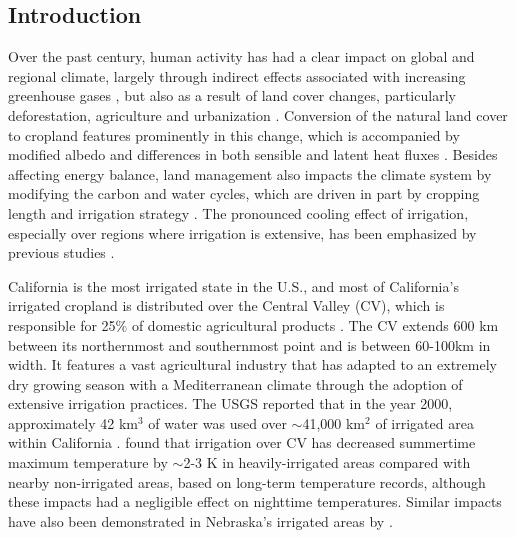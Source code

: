 \documentclass[draft,ms]{agutex}   %
\begin{document}
\begin{article}


%
\section{Introduction}

Over the past century, human activity has had a clear impact on global and regional climate, largely through indirect effects associated with increasing greenhouse gases \citep{solomon2007ipcc}, but also as a result of land cover changes, particularly deforestation, agriculture and urbanization \citep{bonan1997effects, pielke2002influence, kueppers2008seasonal}. Conversion of the natural land cover to cropland features prominently in this change, which is accompanied by modified albedo and differences in both sensible and latent heat fluxes \citep{foley2003green}. Besides affecting energy balance, land management also impacts the climate system by modifying the carbon and water cycles, which are driven in part by cropping length and irrigation strategy \citep{lobell2006biogeophysical}. The pronounced cooling effect of irrigation, especially over regions where irrigation is extensive, has been emphasized by previous studies \citep{kueppers2007irrigation, lobell2008effect}.

California is the most irrigated state in the U.S., and most of California's irrigated cropland is distributed over the Central Valley (CV), which is responsible for 25$\%$ of domestic agricultural products \citep{wilkinson2002preparing}. The CV extends 600 km between its northernmost and southernmost point and is between 60-100km in width.  It features a vast agricultural industry that has adapted to an extremely dry growing season with a Mediterranean climate through the adoption of extensive irrigation practices. The USGS reported that in the year 2000, approximately 42 km$^3$ of water was used over $\sim$41,000 km$^2$ of irrigated area within California \citep{doll2002global, famiglietti2011satellites}. \cite{bonfils2007empirical} found that irrigation over CV has decreased summertime maximum temperature by $\sim$2-3 K in heavily-irrigated areas compared with nearby non-irrigated areas, based on long-term temperature records, although these impacts had a negligible effect on nighttime temperatures. Similar impacts have also been demonstrated in Nebraska's irrigated areas by \citet{mahmood2006impacts}.


\end{article}
\end{document}
